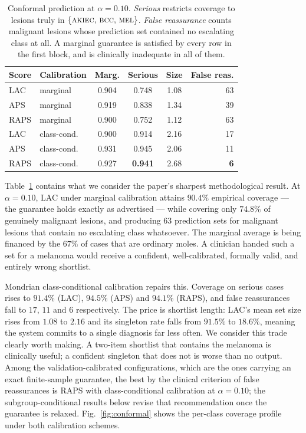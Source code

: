\documentclass[journal]{IEEEtran}
\newcommand{\escset}{\{\textsc{akiec},\,\textsc{bcc},\,\textsc{mel}\}}
\begin{document}
\begin{table}[t]
\centering
\caption{Conformal prediction at $\alpha = 0.10$. \emph{Serious} restricts coverage to
lesions truly in $\escset$. \emph{False reassurance} counts malignant lesions whose
prediction set contained no escalating class at all. A marginal guarantee is satisfied by
every row in the first block, and is clinically inadequate in all of them.}
\label{tab:conformal}
\begin{tabular}{llcccr}
\toprule
Score & Calibration & Marg. & Serious & Size & False reas. \\
\midrule
LAC  & marginal & 0.904 & 0.748 & 1.08 & 63 \\
APS  & marginal & 0.919 & 0.838 & 1.34 & 39 \\
RAPS & marginal & 0.900 & 0.752 & 1.12 & 63 \\
\midrule
LAC  & class-cond. & 0.900 & 0.914 & 2.16 & 17 \\
APS  & class-cond. & 0.931 & 0.945 & 2.06 & 11 \\
RAPS & class-cond. & 0.927 & \textbf{0.941} & 2.68 & \textbf{6} \\
\bottomrule
\end{tabular}
\end{table}

Table~\ref{tab:conformal} contains what we consider the paper's sharpest methodological
result. At $\alpha=0.10$, LAC under marginal calibration attains $90.4\%$ empirical coverage
--- the guarantee holds exactly as advertised --- while covering only $74.8\%$ of genuinely
malignant lesions, and producing $63$ prediction sets for malignant lesions that contain no
escalating class whatsoever. The marginal average is being financed by the $67\%$ of cases
that are ordinary moles. A clinician handed such a set for a melanoma would receive a
confident, well-calibrated, formally valid, and entirely wrong shortlist.

Mondrian class-conditional calibration repairs this. Coverage on serious cases rises to
$91.4\%$ (LAC), $94.5\%$ (APS) and $94.1\%$ (RAPS), and false reassurances fall to $17$,
$11$ and $6$ respectively. The price is shortlist length: LAC's mean set size rises from
$1.08$ to $2.16$ and its singleton rate falls from $91.5\%$ to $18.6\%$, meaning the system
commits to a single diagnosis far less often. We consider this trade clearly worth making.
A two-item shortlist that contains the melanoma is clinically useful; a confident singleton
that does not is worse than no output. Among the validation-calibrated configurations, which
are the ones carrying an exact finite-sample guarantee, the best by the clinical criterion of
false reassurances is RAPS with class-conditional calibration at $\alpha=0.10$; the
subgroup-conditional results below revise that recommendation once the guarantee is relaxed.
Fig.~\ref{fig:conformal} shows the per-class coverage profile under both calibration schemes.
\end{document}
